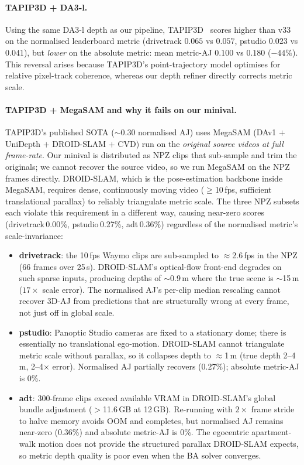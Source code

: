 \documentclass[11pt,a4paper]{article}
\begin{document}
\paragraph{TAPIP3D + DA3-l.}
Using the same DA3-l depth as our pipeline, TAPIP3D~\cite{tapip3d} scores higher than v33 on the
normalised leaderboard metric (drivetrack $0.065$ vs $0.057$, pstudio $0.023$ vs $0.041$), but
\emph{lower} on the absolute metric: mean metric-AJ $0.100$ vs $0.180$ ($-44\%$).
This reversal arises because TAPIP3D's point-trajectory model optimises for relative
pixel-track coherence, whereas our depth refiner directly corrects metric scale.

\paragraph{TAPIP3D + MegaSAM and why it fails on our minival.}
\label{sec:megasam-fail}
TAPIP3D's published SOTA ($\sim$0.30 normalised AJ) uses MegaSAM (DAv1 $+$ UniDepth $+$ DROID-SLAM $+$ CVD)
run on the \emph{original source videos at full frame-rate}.
Our minival is distributed as NPZ clips that sub-sample and trim the originals; we cannot recover the
source video, so we run MegaSAM on the NPZ frames directly.
DROID-SLAM, which is the pose-estimation backbone inside MegaSAM, requires dense, continuously
moving video ($\geq$10\,fps, sufficient translational parallax) to reliably triangulate metric scale.
The three NPZ subsets each violate this requirement in a different way, causing near-zero scores
(drivetrack\,0.00\%, pstudio\,0.27\%, adt\,0.36\%) regardless of the normalised metric's scale-invariance:

\begin{itemize}
\item \textbf{drivetrack}: the 10\,fps Waymo clips are sub-sampled to $\approx$2.6\,fps in the NPZ
  (66 frames over 25\,s). DROID-SLAM's optical-flow front-end degrades on such sparse inputs,
  producing depths of $\sim$0.9\,m where the true scene is $\sim$15\,m ($17\times$ scale error).
  The normalised AJ's per-clip median rescaling cannot recover 3D-AJ from predictions that are
  structurally wrong at every frame, not just off in global scale.

\item \textbf{pstudio}: Panoptic Studio cameras are fixed to a stationary dome; there is essentially
  no translational ego-motion. DROID-SLAM cannot triangulate metric scale without parallax, so it
  collapses depth to $\approx$1\,m (true depth 2--4\,m, 2--4$\times$ error). Normalised AJ
  partially recovers (0.27\%); absolute metric-AJ is 0\%.

\item \textbf{adt}: 300-frame clips exceed available VRAM in DROID-SLAM's global bundle adjustment
  ($>$11.6\,GB at 12\,GB). Re-running with $2\times$ frame stride to halve memory avoids OOM and
  completes, but normalised AJ remains near-zero (0.36\%) and absolute metric-AJ is 0\%.
  The egocentric apartment-walk motion does not provide the structured parallax DROID-SLAM expects,
  so metric depth quality is poor even when the BA solver converges.
\end{itemize}
\end{document}

